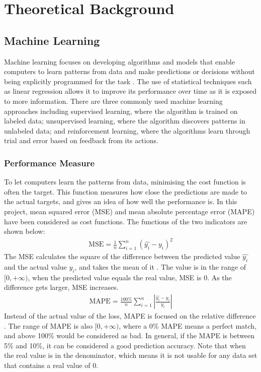 \chapter{Theoretical Background} \label{Chapter:Background}

\section{Machine Learning}

Machine learning focuses on developing algorithms and models that enable computers to learn patterns from data and make predictions or decisions without being explicitly programmed for the task \cite{Murphy}. 
The use of statistical techniques such as linear regression allows it to improve its performance over time as it is exposed to more information. 
There are three commonly used machine learning approaches \cite{Bishop} including supervised learning, where the algorithm is trained on labeled data; 
unsupervised learning, where the algorithm discovers patterns in unlabeled data; and reinforcement learning, where the algorithms learn through trial and error based on feedback from its actions.

\subsection{Performance Measure}

To let computers learn the patterns from data, minimising the cost function is often the target. This function measures how close the predictions are made to the actual targets, and gives an idea of how well the performance is. 
In this project, mean squared error (MSE) and mean absolute percentage error (MAPE) have been considered as cost functions. The functions of the two indicators are shown below:
\begin{gather}
    \mathrm{MSE} = \frac{1}{n}\sum_{i=1}^{n}(\hat{y_i} -y_i)^2 
\end{gather}
The MSE calculates the square of the difference between the predicted value $\hat{y_i}$ and the actual value $y_i$, and takes the mean of it \cite{Bishop}. 
The value is in the range of $[0, +\infty)$, when the predicted value equals the real value, MSE is 0. As the difference gets larger, MSE increases. 
\begin{gather}
    \mathrm{MAPE} = \frac{100\%}{n} \sum_{i=1}^{n} \left | \frac{\hat{y_i}-y_i}{y_i} \right | 
\end{gather}
Instead of the actual value of the loss, MAPE is focused on the relative difference \cite{Hyndman}. The range of MAPE is also $[0, +\infty)$, where a 0\% MAPE means a perfect match, and above 100\% would be considered as bad. 
In general, if the MAPE is between 5\% and 10\%, it can be considered a good prediction accuracy.
Note that when the real value is in the denominator, which means it is not usable for any data set that contains a real value of 0.

